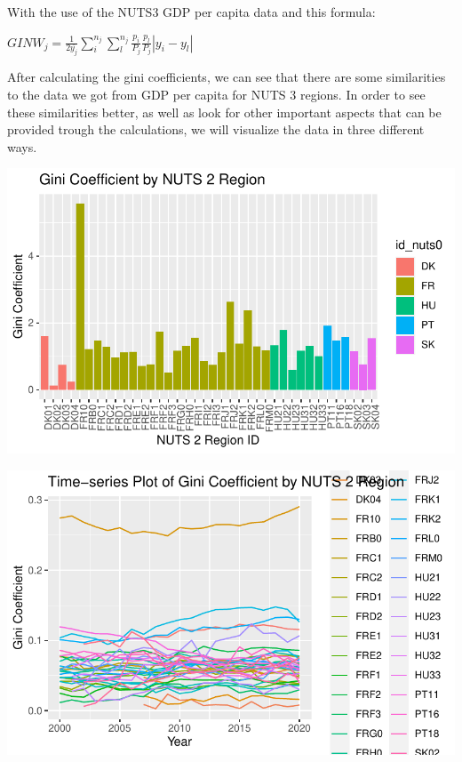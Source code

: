 \documentclass[
  a4paper,
  DIV=11,
  numbers=noendperiod]{scrartcl}
\begin{document}
With the use of the NUTS3 GDP per capita data and this formula:

\(GINW_j=\frac{1}{2 \bar{y_j}} \sum_{i}^{n_j}\sum_{l}^{n_j}\frac{p_i}{P_j} \frac{p_l}{P_j} |y_i-y_l|\)

After calculating the gini coefficients, we can see that there are some
similarities to the data we got from GDP per capita for NUTS 3 regions.
In order to see these similarities better, as well as look for other
important aspects that can be provided trough the calculations, we will
visualize the data in three different ways.

\includegraphics{MSB104_GR_1_Final_Assignment_research_article_files/figure-pdf/unnamed-chunk-23-1.pdf}

\includegraphics{MSB104_GR_1_Final_Assignment_research_article_files/figure-pdf/unnamed-chunk-24-1.pdf}
\end{document}
